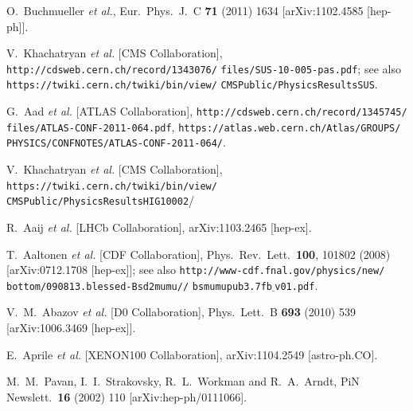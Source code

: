 \documentclass[cits]{PoS}
\begin{document}
\begin{thebibliography}{99}
  O.~Buchmueller {\it et al.},
  Eur.\ Phys.\ J.\  C {\bf 71} (2011) 1634
  [arXiv:1102.4585 [hep-ph]].

V.~Khachatryan {\it et al.} [CMS Collaboration],
{\tt http://cdsweb.cern.ch/record/1343076/}
{\tt files/SUS-10-005-pas.pdf};
see also \\
{\tt https://twiki.cern.ch/twiki/bin/view/}
{\tt CMSPublic/PhysicsResultsSUS}.

G.~Aad {\it et al.} [ATLAS Collaboration],
{\tt http://cdsweb.cern.ch/record/1345745/} {\tt files/ATLAS-CONF-2011-064.pdf},
{\tt https://atlas.web.cern.ch/Atlas/GROUPS/} {\tt PHYSICS/CONFNOTES/ATLAS-CONF-2011-064/}.

 V.~Khachatryan {\it et al.} [CMS Collaboration],
{\tt https://twiki.cern.ch/twiki/bin/view/} {\tt CMSPublic/PhysicsResultsHIG10002}/


 R.~Aaij {\it et al.}  [LHCb Collaboration],
  arXiv:1103.2465 [hep-ex].

 T.~Aaltonen {\it et al.}  [CDF Collaboration],
  Phys.\ Rev.\ Lett.\  {\bf 100}, 101802 (2008)
  [arXiv:0712.1708 [hep-ex]]; see also
{\tt http://www-cdf.fnal.gov/physics/new/}
{\tt bottom/090813.blessed-Bsd2mumu//}
{\tt bsmumupub3.7fb$\underline{~}$v01.pdf}.

 V.~M.~Abazov {\it et al.}  [D0 Collaboration],
  Phys.\ Lett.\  B {\bf 693} (2010) 539 
  [arXiv:1006.3469 [hep-ex]].

E.~Aprile {\it et al.}  [XENON100 Collaboration],
  arXiv:1104.2549 [astro-ph.CO].

M.~M.~Pavan, I.~I.~Strakovsky, R.~L.~Workman and R.~A.~Arndt,
PiN Newslett.\  {\bf 16} (2002) 110 
[arXiv:hep-ph/0111066].
\end{thebibliography}
\end{document}
